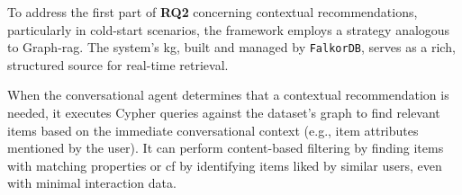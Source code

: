 To address the first part of \textbf{RQ2} concerning contextual recommendations, particularly in cold-start scenarios, the framework employs a strategy analogous to Graph-\ac{rag}. The system's \ac{kg}, built and managed by \texttt{FalkorDB}, serves as a rich, structured source for real-time retrieval.

When the conversational agent determines that a contextual recommendation is needed, it executes Cypher queries against the dataset's graph to find relevant items based on the immediate conversational context (e.g., item attributes mentioned by the user). It can perform content-based filtering by finding items with matching properties or \acl{cf} by identifying items liked by similar users, even with minimal interaction data.